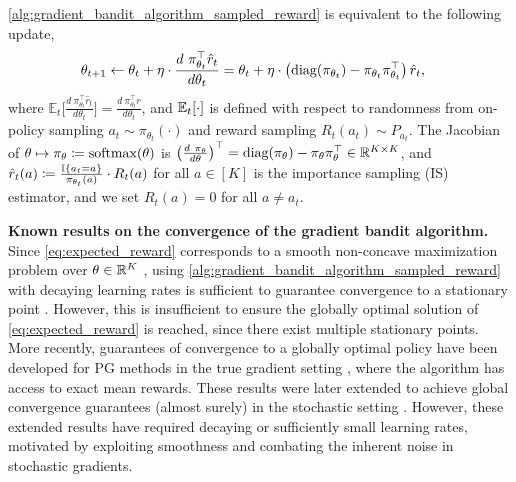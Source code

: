\begin{proposition}
\label{prop:gradient_bandit_algorithm_equivalent_to_stochastic_gradient_ascent_sampled_reward}
\cref{alg:gradient_bandit_algorithm_sampled_reward} is equivalent to the following update,
\begin{align}
\label{eq:stochastic_gradient_ascent_sampled_reward}
    \theta_{t+1} &\gets  \theta_{t} + \eta \cdot \frac{d \ \pi_{\theta_t}^\top \hat{r}_t}{d \theta_t} = \theta_t + \eta \cdot \left(  \diagonalmatrix{(\pi_{\theta_t})} - \pi_{\theta_t} \pi_{\theta_t}^\top \right) \hat{r}_t,
\end{align}
where $\mathbb{E}_t{ \Big[ \frac{d \ \pi_{\theta_t}^\top \hat{r}_t }{d \theta_t} \Big] } = \frac{d \ \pi_{\theta_t}^\top r}{d \theta_t }$, and $\mathbb{E}_t[\cdot]$ is defined with respect to randomness from on-policy sampling $a_t \sim \pi_{\theta_t}(\cdot)$ and reward sampling $R_t(a_t)\sim P_{a_t}$. The Jacobian of $\theta \mapsto \pi_\theta \coloneqq \mathrm{softmax}(\theta)$ is $\left( \frac{d \ \pi_{\theta}}{d \theta} \right)^\top = \text{diag}{(\pi_{\theta})} - \pi_{\theta} \pi_{\theta}^\top \in {\mathbb{R}}^{K \times K}$, and 
$\hat{r}_t(a) \coloneqq \frac{ {\mathbb{I}}\left\{ a_t = a \right\} }{ \pi_{\theta_t}(a) } \cdot R_t(a)$ for all $a \in [K]$ is the importance sampling (IS) estimator, and we set $R_t(a)=0$ for all $a \not= a_t$. 
\end{proposition}
\textbf{Known results on the convergence of the gradient bandit algorithm.}
Since \cref{eq:expected_reward} corresponds to a smooth non-concave maximization problem over $\theta \in {\mathbb{R}}^K$ \citep{mei2020global}, using \cref{alg:gradient_bandit_algorithm_sampled_reward} with decaying learning rates is sufficient to guarantee convergence to a stationary point \citep{robbins1951stochastic,nemirovski2009robust,ghadimi2013stochastic,zhang2020global}. However, this is insufficient to ensure the  globally optimal solution of \cref{eq:expected_reward} is reached, since there exist multiple stationary points. More recently, guarantees of convergence to a globally optimal policy have been developed for PG methods in the true gradient setting \citep{agarwal2021theory,mei2020global}, where the algorithm has access to exact mean rewards. These results were later extended to achieve global convergence guarantees (almost surely) in the stochastic setting \citep{zhang2020sample,ding2021beyond,zhang2021convergence,yuan2022general,mei2024stochastic,lu2024towards}. However, these extended results have required decaying or sufficiently small learning rates, motivated by exploiting smoothness and combating the inherent noise in stochastic gradients.

